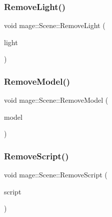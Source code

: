 \hypertarget{classmage_1_1_scene_a371c31d030990b9fa641271c4c733d87}{}\label{classmage_1_1_scene_a371c31d030990b9fa641271c4c733d87} 
\subsubsection{\texorpdfstring{Remove\+Light()}{RemoveLight()}\hspace{0.1cm}{\footnotesize\ttfamily [2/2]}}
{\footnotesize\ttfamily void mage\+::\+Scene\+::\+Remove\+Light (\begin{DoxyParamCaption}\item[{\hyperlink{namespacemage_a1e01ae66713838a7a67d30e44c67703e}{Shared\+Ptr}$<$ \hyperlink{namespacemage_aeed5dee4ff6c591eabb0e9114256df4a}{Spot\+Light\+Node} $>$}]{light }\end{DoxyParamCaption})\hspace{0.3cm}{\ttfamily [private]}}

\hypertarget{classmage_1_1_scene_a1b66a3d247eaa143234d15d72aa67a85}{}\label{classmage_1_1_scene_a1b66a3d247eaa143234d15d72aa67a85} 
\subsubsection{\texorpdfstring{Remove\+Model()}{RemoveModel()}}
{\footnotesize\ttfamily void mage\+::\+Scene\+::\+Remove\+Model (\begin{DoxyParamCaption}\item[{\hyperlink{namespacemage_a1e01ae66713838a7a67d30e44c67703e}{Shared\+Ptr}$<$ \hyperlink{classmage_1_1_model_node}{Model\+Node} $>$}]{model }\end{DoxyParamCaption})\hspace{0.3cm}{\ttfamily [private]}}

\hypertarget{classmage_1_1_scene_a82705ba56543dea410439760b1667bc5}{}\label{classmage_1_1_scene_a82705ba56543dea410439760b1667bc5} 
\subsubsection{\texorpdfstring{Remove\+Script()}{RemoveScript()}}
{\footnotesize\ttfamily void mage\+::\+Scene\+::\+Remove\+Script (\begin{DoxyParamCaption}\item[{\hyperlink{namespacemage_a1e01ae66713838a7a67d30e44c67703e}{Shared\+Ptr}$<$ \hyperlink{classmage_1_1_behavior_script}{Behavior\+Script} $>$}]{script }\end{DoxyParamCaption})}

